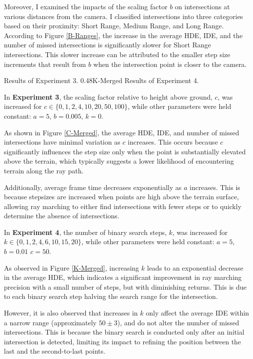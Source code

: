Moreover, I examined the impacts of the scaling factor $b$ on intersections at various distances from the camera. I classified intersections into three categories based on their proximity: Short Range, Medium Range, and Long Range. According to Figure \ref{B-Ranges}, the increase in the average HDE, IDE, and the number of missed intersections is significantly slower for Short Range intersections. This slower increase can be attributed to the smaller step size increments that result from $b$ when the intersection point is closer to the camera.


{Results of Experiment 3.}
{0.48}{K-Merged}
{Results of Experiment 4.}

In \textbf{Experiment 3}, the scaling factor relative to height above ground, $c$, was increased for $c \in \{0, 1, 2, 4, 10, 20, 50, 100\}$, while other parameters were held constant: $a = 5$, $b=0.005$, $k = 0$.

As shown in Figure \ref{C-Merged}, the average HDE, IDE, and number of missed intersections have minimal variation as $c$ increases. This occurs because $c$ significantly influences the step size only when the point is substantially elevated above the terrain, which typically suggests a lower likelihood of encountering terrain along the ray path.

Additionally, average frame time decreases exponentially as $a$ increases. This is because stepsizes are increased when points are high above the terrain surface, allowing ray marching to either find intersections with fewer steps or to quickly determine the absence of intersections.


In \textbf{Experiment 4}, the number of binary search steps, $k$, was increased for $k \in \{0, 1, 2, 4, 6, 10, 15, 20\}$, while other parameters were held constant: $a = 5$, $b=0.01$ $c = 50$.

As observed in Figure \ref{K-Merged}, increasing $k$ leads to an exponential decrease in the average HDE, which indicates a significant improvement in ray marching precision with a small number of steps, but with diminishing returns. This is due to each binary search step halving the search range for the intersection.

However, it is also observed that increases in $k$ only affect the average IDE within a narrow range (approximately $50 \pm 3$), and do not alter the number of missed intersections. This is because the binary search is conducted only after an initial intersection is detected, limiting its impact to refining the position between the last and the second-to-last points.

